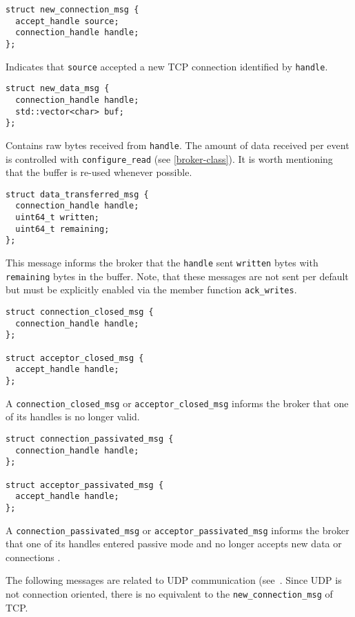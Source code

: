 \begin{lstlisting}
struct new_connection_msg {
  accept_handle source;
  connection_handle handle;
};
\end{lstlisting}

Indicates that \lstinline^source^ accepted a new TCP connection identified by
\lstinline^handle^.

\begin{lstlisting}
struct new_data_msg {
  connection_handle handle;
  std::vector<char> buf;
};
\end{lstlisting}

Contains raw bytes received from \lstinline^handle^. The amount of data
received per event is controlled with \lstinline^configure_read^ (see
\ref{broker-class}). It is worth mentioning that the buffer is re-used whenever
possible.

\begin{lstlisting}
struct data_transferred_msg {
  connection_handle handle;
  uint64_t written;
  uint64_t remaining;
};
\end{lstlisting}

This message informs the broker that the \lstinline^handle^ sent
\lstinline^written^ bytes with \lstinline^remaining^ bytes in the buffer. Note,
that these messages are not sent per default but must be explicitly enabled via
the member function \lstinline^ack_writes^.

\begin{lstlisting}
struct connection_closed_msg {
  connection_handle handle;
};

struct acceptor_closed_msg {
  accept_handle handle;
};
\end{lstlisting}

A \lstinline^connection_closed_msg^ or \lstinline^acceptor_closed_msg^ informs
the broker that one of its handles is no longer valid.

\begin{lstlisting}
struct connection_passivated_msg {
  connection_handle handle;
};

struct acceptor_passivated_msg {
  accept_handle handle;
};
\end{lstlisting}

A \lstinline^connection_passivated_msg^ or \lstinline^acceptor_passivated_msg^
informs the broker that one of its handles entered passive mode and no longer
accepts new data or connections .

The following messages are related to UDP communication
(see~. Since UDP is not connection oriented, there is
no equivalent to the \lstinline^new_connection_msg^ of TCP.

